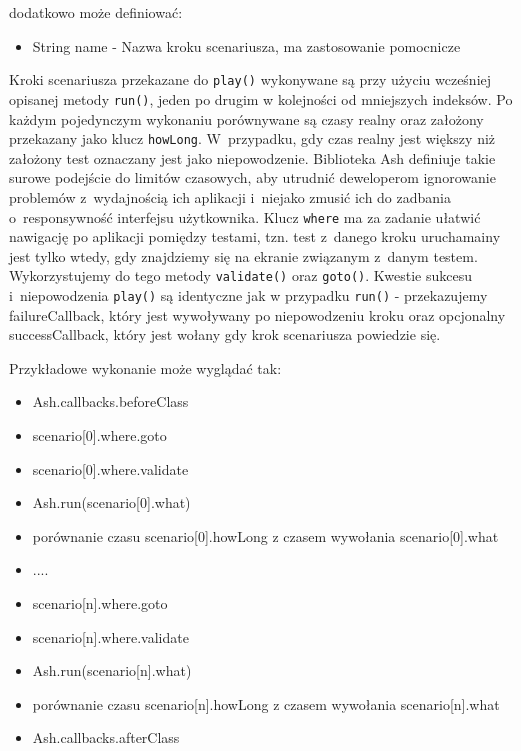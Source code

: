 \documentclass[brudnopis]{xmgr}
\begin{document}
dodatkowo może definiować:

\begin{itemize} 
  \item String name - Nazwa kroku scenariusza, ma zastosowanie pomocnicze
\end{itemize}

Kroki scenariusza przekazane do \texttt{play()} wykonywane są przy użyciu wcześniej opisanej metody \texttt{run()}, jeden po drugim w kolejności od mniejszych indeksów. Po każdym pojedynczym wykonaniu porównywane są czasy realny oraz założony przekazany jako klucz \texttt{howLong}. W~przypadku, gdy czas realny jest większy niż założony test oznaczany jest jako niepowodzenie. Biblioteka Ash definiuje takie surowe podejście do limitów czasowych, aby utrudnić deweloperom ignorowanie problemów z~wydajnością ich aplikacji i~niejako zmusić ich do zadbania o~responsywność interfejsu użytkownika. Klucz \texttt{where} ma za zadanie ułatwić nawigację po aplikacji pomiędzy testami, tzn. test z~danego kroku uruchamainy jest tylko wtedy, gdy znajdziemy się na ekranie związanym z~danym testem. Wykorzystujemy do tego metody \texttt{validate()} oraz \texttt{goto()}. Kwestie sukcesu i~niepowodzenia \texttt{play()} są identyczne jak w przypadku \texttt{run()} - przekazujemy failureCallback, który jest wywoływany po niepowodzeniu kroku oraz opcjonalny successCallback,  który jest wołany gdy krok scenariusza powiedzie się. 

Przykładowe wykonanie może wyglądać tak:

\begin{itemize}
  \item Ash.callbacks.beforeClass
  \item scenario[0].where.goto
  \item scenario[0].where.validate
  \item Ash.run(scenario[0].what)
  \item porównanie czasu scenario[0].howLong z czasem wywołania scenario[0].what
  \item ....
  \item scenario[n].where.goto
  \item scenario[n].where.validate
  \item Ash.run(scenario[n].what)
  \item porównanie czasu scenario[n].howLong z czasem wywołania scenario[n].what
  \item Ash.callbacks.afterClass
\end{itemize}
\end{document}
